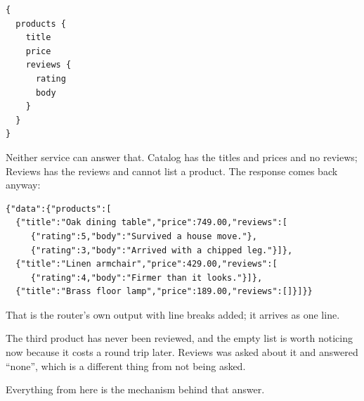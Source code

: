 \begin{verbatim}
{
  products {
    title
    price
    reviews {
      rating
      body
    }
  }
}
\end{verbatim}

Neither service can answer that. Catalog has the titles and prices and no
reviews; Reviews has the reviews and cannot list a product. The response comes
back anyway:

\begin{verbatim}
{"data":{"products":[
  {"title":"Oak dining table","price":749.00,"reviews":[
     {"rating":5,"body":"Survived a house move."},
     {"rating":3,"body":"Arrived with a chipped leg."}]},
  {"title":"Linen armchair","price":429.00,"reviews":[
     {"rating":4,"body":"Firmer than it looks."}]},
  {"title":"Brass floor lamp","price":189.00,"reviews":[]}]}}
\end{verbatim}

That is the router's own output with line breaks added; it arrives as one line.

The third product has never been reviewed, and the empty list is worth noticing
now because it costs a round trip later. Reviews was asked about it and answered
\enquote{none}, which is a different thing from not being asked.

Everything from here is the mechanism behind that answer.

%
